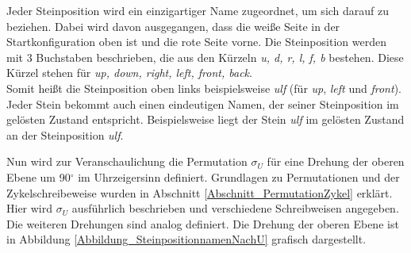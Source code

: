 \documentclass[12pt,a4paper, usenames, dvipsnames]{article}
\theoremstyle{mystyle}
\theoremstyle{definition}
\begin{document}
Jeder Steinposition wird ein einzigartiger Name zugeordnet, um sich darauf zu beziehen. Dabei wird davon ausgegangen, dass die weiße Seite in der Startkonfiguration oben ist und die rote Seite vorne. Die Steinposition werden mit 3 Buchstaben beschrieben, die aus den Kürzeln \textit{u, d, r, l, f, b} bestehen. Diese Kürzel stehen für \textit{up, down, right, left, front, back}. \\
Somit heißt die Steinposition oben links beispielsweise \textit{ulf} (für \textit{up}, \textit{left} und \textit{front}). 
Jeder Stein bekommt auch einen eindeutigen Namen, der seiner Steinposition im gelösten Zustand entspricht. Beispielsweise liegt der Stein \textit{ulf} im gelösten Zustand an der Steinposition \textit{ulf}.

Nun wird zur Veranschaulichung die Permutation $\sigma_U$ für eine Drehung der oberen Ebene um 90$^\circ$ im Uhrzeigersinn definiert. Grundlagen zu Permutationen und der Zykelschreibeweise wurden in Abschnitt \ref{Abschnitt_PermutationZykel} erklärt.
Hier wird $\sigma_U$ ausführlich beschrieben und verschiedene Schreibweisen angegeben. Die weiteren Drehungen sind analog definiert. 
Die Drehung der oberen Ebene ist in Abbildung \ref{Abbildung_SteinpositionnamenNachU} grafisch dargestellt.
\end{document}
